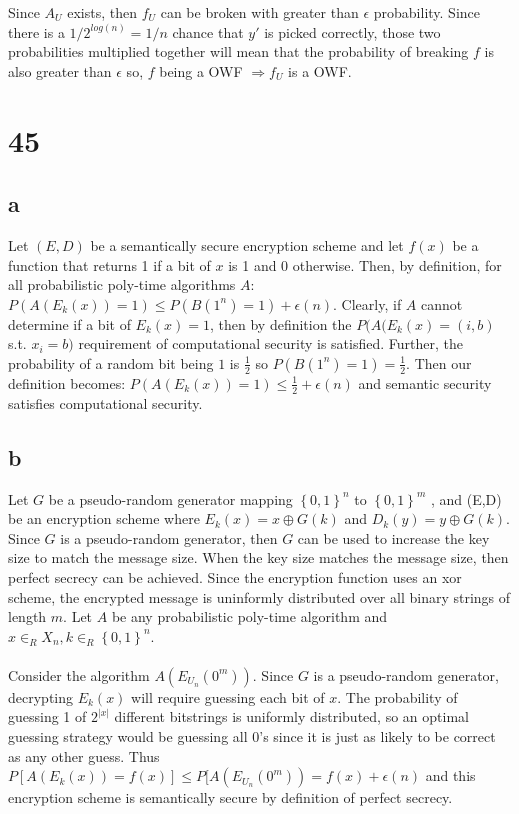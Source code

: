 \documentclass[letterpaper,notitlepage,twoside]{article}
\renewcommand{\implies}{\Rightarrow} %
\begin{document}
Since $A_U$ exists, then $f_U$ can be broken with greater than $\epsilon$ probability. Since there is a $1/2^{log(n)} = 1/n$ chance that $y'$ is picked correctly, those two probabilities multiplied together will mean that the probability of breaking $f$ is also greater than $\epsilon$ so, $f$ being a OWF $\implies f_U$ is a OWF.

\section*{45}
\subsection*{a}
Let $(E, D)$ be a semantically secure encryption scheme and let $f(x)$ be a function that returns 1 if a bit of $x$ is 1 and 0 otherwise.
Then, by definition, for all probabilistic poly-time algorithms $A$: $P(A(E_k(x)) = 1) \leq P(B(1^{n}) = 1) + \epsilon(n)$.
Clearly, if $A$ cannot determine if a bit of $E_k(x) = 1$, then by definition the $P(A(E_k(x) = (i,b)$ s.t. $x_i = b)$ requirement of computational security is satisfied. 
Further, the probability of a random bit being $1$ is $\frac{1}{2}$ so $P(B(1^{n}) = 1) = \frac{1}{2}$. 
Then our definition becomes: $P(A(E_k(x)) = 1) \leq \frac{1}{2} + \epsilon(n)$ and semantic security satisfies computational security.

\subsection*{b}
Let $G$ be a pseudo-random generator mapping $\left\{0, 1\right\}^n$ to $\left\{0, 1\right\}^m$ , and (E,D) be an encryption scheme where $E_k(x) = x \oplus G(k)$ and $D_k(y) = y \oplus G(k)$. Since $G$ is a pseudo-random generator, then $G$ can be used to increase the key size to match the message size. When the key size matches the message size, then perfect secrecy can be achieved. Since the encryption function uses an xor scheme, the encrypted message is uninformly distributed over all binary strings of length $m$. Let $A$ be any probabilistic poly-time algorithm and $x \in_R X_n,k \in_R \left\{0,1\right\}^n$.
\\\\
Consider the algorithm $A(E_{U_n}(0^m))$. Since $G$ is a pseudo-random generator, decrypting $E_k(x)$ will require guessing each bit of $x$. The probability of guessing 1 of $2^{|x|}$ different bitstrings is uniformly distributed, so an optimal guessing strategy would be guessing all 0's since it is just as likely to be correct as any other guess. Thus $P[A(E_k(x))=f(x)] \le P[A(E_{U_n}(0^m)) = f(x) + \epsilon(n)$ and this encryption scheme is semantically secure by definition of perfect secrecy.
\end{document}
